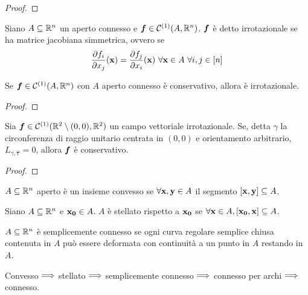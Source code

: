 \begin{proof}
\end{proof}

\begin{definition}
	Siano $A\subseteq\mathbb{R}^n$ un aperto connesso e $\bm f \in \mathcal{C}^{(1)}(A,\mathbb{R}^n)$. $\bm f$ è detto irrotazionale se ha matrice jacobiana simmetrica, ovvero se
	$$
		\frac{\partial f_i}{\partial x_j}(\vb{x})=\frac{\partial f_j}{\partial x_i}(\vb{x}) \ \forall \vb{x} \in A \ \forall i,j \in [n]
	$$
\end{definition}

\begin{theorem}
	Se $\bm f \in \mathcal{C}^{(1)}(A,\mathbb{R}^n)$ con $A$ aperto connesso è conservativo, allora è irrotazionale.
\end{theorem}

\begin{proof}
\end{proof}

\begin{theorem}
	Sia $\bm f \in \mathcal{C}^{(1)}(\mathbb{R}^2\setminus{(0,0)}, \mathbb{R}^2)$ un campo vettoriale irrotazionale. Se, detta $\gamma$ la circonferenza di raggio unitario centrata in $(0,0)$ e orientamento arbitrario, $L_{\gamma, \hat{\bm\tau}}=0$, allora $\bm f$ è conservativo.
\end{theorem}

\begin{proof}
\end{proof}

\begin{definition}
	$A \subseteq \mathbb{R}^n$ aperto è un insieme convesso se $\forall \vb{x},\vb{y} \in A$ il segmento $[\vb{x},\vb{y}] \subseteq A$.
\end{definition}

\begin{definition}
	Siano $A \subseteq \mathbb{R}^n$ e $\vb{x_0} \in A$. $A$ è stellato rispetto a $\vb{x_0}$ se $\forall \vb{x} \in A, [\vb{x_0},\vb{x}]\subseteq A$.
\end{definition}

\begin{definition}
	$A \subseteq \mathbb{R}^n$ è semplicemente connesso se ogni curva regolare semplice chiusa contenuta in $A$ può essere deformata con continuità a un punto in $A$ restando in $A$.
\end{definition}

\begin{remark}
	Convesso $\Longrightarrow$ stellato $\Longrightarrow$ semplicemente connesso $\Longrightarrow$ connesso per archi $\Longrightarrow$ connesso.
\end{remark}

